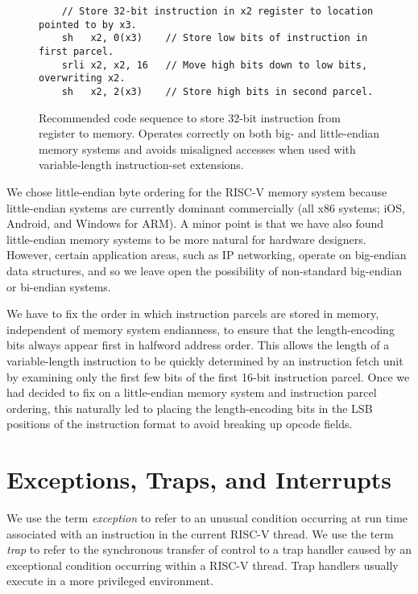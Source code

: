 \begin{figure}[ht]
\begin{verbatim}
    // Store 32-bit instruction in x2 register to location pointed to by x3.
    sh   x2, 0(x3)    // Store low bits of instruction in first parcel.
    srli x2, x2, 16   // Move high bits down to low bits, overwriting x2.
    sh   x2, 2(x3)    // Store high bits in second parcel.
\end{verbatim}
\caption{Recommended code sequence to store 32-bit instruction from register to
  memory.  Operates correctly on both big- and little-endian
  memory systems and avoids misaligned accesses when used with variable-length
  instruction-set extensions.}
\label{fig:storeinstruction}
\end{figure}

\begin{commentary}
We chose little-endian byte ordering for the RISC-V memory system
because little-endian systems are currently dominant commercially (all
x86 systems; iOS, Android, and Windows for ARM).  A minor point is
that we have also found little-endian memory systems to be more
natural for hardware designers.  However, certain application areas,
such as IP networking, operate on big-endian data structures, and so
we leave open the possibility of non-standard big-endian or bi-endian
systems.

We have to fix the order in which instruction parcels are stored in
memory, independent of memory system endianness, to ensure that the
length-encoding bits always appear first in halfword address
order. This allows the length of a variable-length instruction to be
quickly determined by an instruction fetch unit by examining only the
first few bits of the first 16-bit instruction parcel.  Once we had
decided to fix on a little-endian memory system and instruction parcel
ordering, this naturally led to placing the length-encoding bits in
the LSB positions of the instruction format to avoid breaking up
opcode fields.
\end{commentary}

\section{Exceptions, Traps, and Interrupts}

We use the term {\em exception} to refer to an unusual condition
occurring at run time associated with an instruction in the current
RISC-V thread.  We use the term {\em trap} to refer to the synchronous
transfer of control to a trap handler caused by an exceptional
condition occurring within a RISC-V thread.  Trap handlers usually
execute in a more privileged environment.

